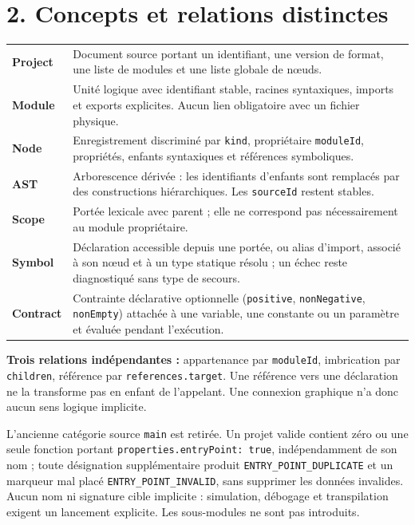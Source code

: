 \documentclass[11pt,a4paper]{article}
\newcommand{\code}[1]{\texttt{#1}}
\begin{document}
\section*{2. Concepts et relations distinctes}
\begin{tabular}{@{}p{29mm}p{131mm}@{}}
\textbf{Project} & Document source portant un identifiant, une version de format,
une liste de modules et une liste globale de nœuds.\\[3pt]
\textbf{Module} & Unité logique avec identifiant stable, racines syntaxiques,
imports et exports explicites. Aucun lien obligatoire avec un fichier physique.\\[3pt]
\textbf{Node} & Enregistrement discriminé par \code{kind}, propriétaire
\code{moduleId}, propriétés, enfants syntaxiques et références symboliques.\\[3pt]
\textbf{AST} & Arborescence dérivée : les identifiants d'enfants sont remplacés
par des constructions hiérarchiques. Les \code{sourceId} restent stables.\\[3pt]
\textbf{Scope} & Portée lexicale avec parent ; elle ne correspond pas nécessairement
au module propriétaire.\\[3pt]
\textbf{Symbol} & Déclaration accessible depuis une portée, ou alias d'import,
associé à son nœud et à un type statique résolu ; un échec reste diagnostiqué sans type de secours.\\[3pt]
\textbf{Contract} & Contrainte déclarative optionnelle (\code{positive},
\code{nonNegative}, \code{nonEmpty}) attachée à une variable, une constante ou
un paramètre et évaluée pendant l'exécution.\\
\end{tabular}

\textbf{Trois relations indépendantes :} appartenance par \code{moduleId},
imbrication par \code{children}, référence par \code{references.target}.
Une référence vers une déclaration ne la transforme pas en enfant de l'appelant.
Une connexion graphique n'a donc aucun sens logique implicite.

L'ancienne catégorie source \code{main} est retirée. Un projet valide contient
zéro ou une seule fonction portant \code{properties.entryPoint: true},
indépendamment de son nom ; toute désignation supplémentaire produit
\code{ENTRY\_POINT\_DUPLICATE} et un marqueur mal placé
\code{ENTRY\_POINT\_INVALID}, sans supprimer les données invalides. Aucun nom
ni signature cible implicite : simulation, débogage et transpilation exigent un
lancement explicite. Les sous-modules ne sont pas introduits.
\end{document}
